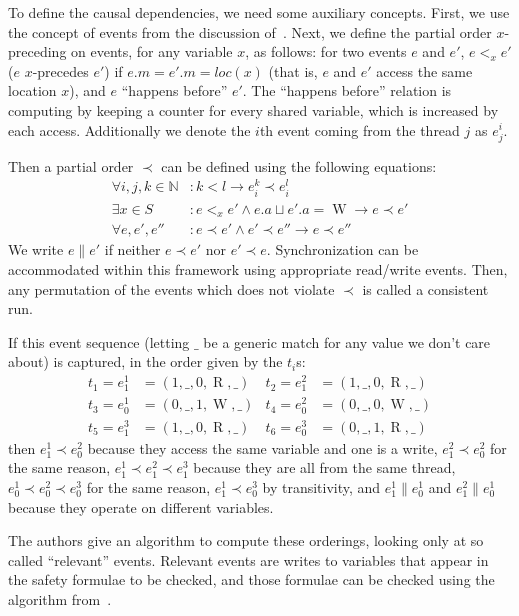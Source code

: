 \documentclass{article}
\DeclareMathOperator{\READ}{R}
\DeclareMathOperator{\WRITE}{W}
\begin{document}
\begin{multicols}{2}
To define the causal dependencies, we need some auxiliary concepts.
First, we use the concept of events from the discussion
of~\cite{512560}.  Next, we define the partial order $x$-preceding on
events, for any variable $x$, as follows: for two events $e$ and $e'$,
$e <_x e'$ ($e$ $x$-precedes $e'$) if $e.m = e'.m = loc(x)$ (that is,
$e$ and $e'$ access the same location $x$), and $e$ ``happens before''
$e'$.  The ``happens before'' relation is computing by keeping a
counter for every shared variable, which is increased by each access.
Additionally we denote the $i$th event coming from the thread $j$ as
$e^i_j$.

Then a partial order $\prec$ can be defined using the following
equations:
\begin{align*}
\forall i, j, k \in \mathbb{N} & : k < l \rightarrow e_i^k \prec e_i^l \\
\exists x \in S & : e <_x e' \wedge e.a \sqcup e'.a = \WRITE
\rightarrow e \prec e' \\
\forall e, e', e'' & : e \prec e' \wedge e' \prec e'' \rightarrow e \prec e''
\end{align*}
We write $e \| e'$ if neither $e \prec e'$ nor $e' \prec e$.
Synchronization can be accommodated within this framework using
appropriate read/write events.  Then, any permutation of the events
which does not violate $\prec$ is called a consistent run.

If this event sequence (letting $\_$ be a generic match for any value
we don't care about) is captured, in the order given by the $t_i$s:
\begin{align*}
  t_1 = e^1_1 & = (1, \_, 0, \READ, \_) &
  t_2 = e^2_1 & = (1, \_, 0, \READ, \_) \\
  t_3 = e^1_0 & = (0, \_, 1, \WRITE, \_) &
  t_4 = e^2_0 & = (0, \_, 0, \WRITE, \_) \\
  t_5 = e^3_1 & = (1, \_, 0, \READ, \_) &
  t_6 = e^3_0 & = (0, \_, 1, \READ, \_)
\end{align*}
then $e^1_1 \prec e^2_0$ because they access the same variable and one
is a write, $e^2_1 \prec e^2_0$ for the same reason, $e^1_1 \prec
e^2_1 \prec e^3_1$ because they are all from the same thread, $e^1_0
\prec e^2_0 \prec e^3_0$ for the same reason, $e^1_1 \prec e^3_0$ by
transitivity, and $e^1_1 \| e^1_0$ and $e^2_1 \| e^1_0$ because they
operate on different variables.

The authors give an algorithm to compute these orderings, looking only
at so called ``relevant'' events.  Relevant events are writes to
variables that appear in the safety formulae to be checked, and those
formulae can be checked using the algorithm from~\cite{694486}.


\end{multicols}
\end{document}
